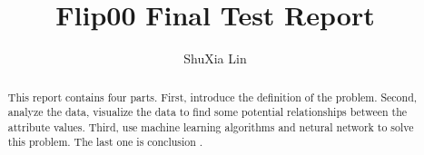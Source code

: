 \documentclass{amsart}
\begin{document}
%
%
\title[A Short Running Title]{Flip00 Final Test Report}%

\author{ShuXia Lin}
\address[A.~1]{School of Computer Science,\\ 
SouthEast University, Nanjing , China}%




%
\date{\gitAuthorDate}%

\begin{abstract}
This report contains four parts. 
First, 
introduce the definition of the problem. 
Second, 
analyze the data, 
visualize the data to find some potential relationships 
between 
the attribute values. 
Third, 
use machine learning algorithms and 
netural network to solve this problem.
The last one is conclusion . 
\end{abstract}

\maketitle
\tableofcontents

\newpage






\newpage



\listoftodos
\end{document}
